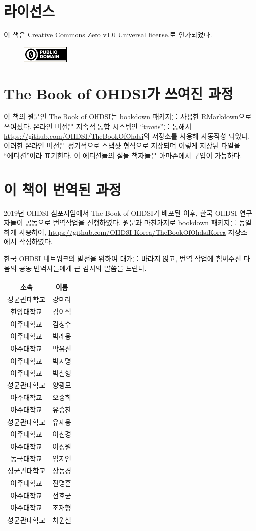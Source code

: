 \documentclass[11pt]{book}
\theoremstyle{definition}
\theoremstyle{definition}
\theoremstyle{definition}
\theoremstyle{remark}
\begin{document}
\section*{라이선스}

이 책은
\href{http://creativecommons.org/publicdomain/zero/1.0/}{Creative
Commons Zero v1.0 Universal license}.로 인가되었다.

\begin{figure}
\centering
\includegraphics{images/Preface/cc0.png}
\caption{}
\end{figure}

\section*{The Book of OHDSI가 쓰여진 과정}\label{the-book-of-ohdsi--}

이 책의 원문인 The Book of OHDSI는 \href{https://bookdown.org}{bookdown}
패키지를 사용한 \href{https://rmarkdown.rstudio.com}{RMarkdown}으로
쓰여졌다. 온라인 버전은 지속적 통합 시스템인
\href{http://travis-ci.org/}{``travis''}를 통해서
\url{https://github.com/OHDSI/TheBookOfOhdsi}의 저장소를 사용해 자동작성
되었다. 이러한 온라인 버전은 정기적으로 스냅샷 형식으로 저장되며 이렇게
저장된 파일을 ``에디션''이라 표기한다. 이 에디션들의 실물 책자들은
아마존에서 구입이 가능하다.

\section*{이 책이 번역된 과정}\label{---}

2019년 OHDSI 심포지엄에서 The Book of OHDSI가 배포된 이후, 한국 OHDSI
연구자들이 공동으로 번역작업을 진행하였다. 원문과 마찬가지로 bookdown
패키지를 동일하게 사용하여,
\url{https://github.com/OHDSI-Korea/TheBookOfOhdsiKorea} 저장소에서
작성하였다.

한국 OHDSI 네트워크의 발전을 위하여 대가를 바라지 않고, 번역 작업에
힘써주신 다음의 공동 번역자들에게 큰 감사의 말씀을 드린다.

\begin{longtable}[]{@{}cc@{}}
\toprule
소속 & 이름\tabularnewline
\midrule
\endhead
성균관대학교 & 강미라\tabularnewline
한양대학교 & 김이석\tabularnewline
아주대학교 & 김청수\tabularnewline
아주대학교 & 박래웅\tabularnewline
아주대학교 & 박유진\tabularnewline
아주대학교 & 박지명\tabularnewline
아주대학교 & 박철형\tabularnewline
성균관대학교 & 양광모\tabularnewline
아주대학교 & 오송희\tabularnewline
아주대학교 & 유승찬\tabularnewline
성균관대학교 & 유재용\tabularnewline
아주대학교 & 이선경\tabularnewline
아주대학교 & 이성원\tabularnewline
동국대학교 & 임지연\tabularnewline
성균관대학교 & 장동경\tabularnewline
아주대학교 & 전명훈\tabularnewline
아주대학교 & 전호균\tabularnewline
아주대학교 & 조재형\tabularnewline
성균관대학교 & 차원철\tabularnewline
\bottomrule
\end{longtable}
\end{document}
